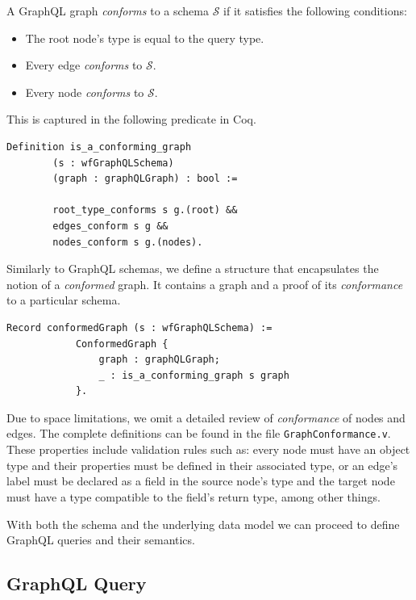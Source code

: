 \begin{definition}
A GraphQL graph \textit{conforms} to a schema $\mathcal{S}$ if it satisfies the following conditions:
\begin{itemize}
    \item The root node's type is equal to the query type.
    \item Every edge \textit{conforms} to $\mathcal{S}$.
    \item Every node \textit{conforms} to $\mathcal{S}$.
\end{itemize}
\end{definition}

This is captured in the following predicate in Coq.
\begin{verbatim}
Definition is_a_conforming_graph
        (s : wfGraphQLSchema)
        (graph : graphQLGraph) : bool :=

        root_type_conforms s g.(root) &&
        edges_conform s g &&
        nodes_conform s g.(nodes).
\end{verbatim}

Similarly to GraphQL schemas, we define a structure that encapsulates the notion of a \textit{conformed} graph. It contains a graph and a proof of its \textit{conformance} to a particular schema.

\begin{verbatim}
Record conformedGraph (s : wfGraphQLSchema) :=
            ConformedGraph {
                graph : graphQLGraph;
                _ : is_a_conforming_graph s graph
            }.
\end{verbatim}

Due to space limitations, we omit a detailed review of \textit{conformance} of nodes and edges. The complete definitions can be found in the file \texttt{GraphConformance.v}. These properties include validation rules such as: every node must have an object type and their properties must be defined in their associated type, or an edge's label must be declared as a field in the source node's type and the target node must have a type compatible to the field's return type, among other things.

With both the schema and the underlying data model we can proceed to define GraphQL queries and their semantics.

\subsection{GraphQL Query}

